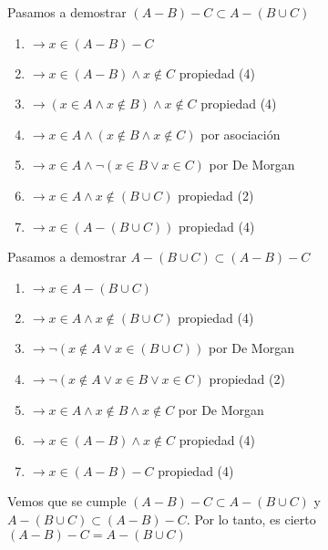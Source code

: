         Pasamos a demostrar $ (A - B) - C \subset A - (B \cup C) $
        
        \begin{enumerate}
            \item $\to x \in (A - B) - C  $ 
            \item $\to x \in (A - B) \wedge x \notin C $ propiedad (4)
            \item $\to (x \in A  \wedge x \notin B) \wedge x \notin C $ propiedad (4)
            \item $\to x \in A  \wedge (x \notin B \wedge x \notin C) $ por  asociación
            \item $\to x \in A  \wedge \neg (x \in B \vee x \in C) $ por  De Morgan
            \item $\to x \in A  \wedge x \notin (B \cup C) $ propiedad (2)
            \item $\to x \in (A - (B \cup C)) $ propiedad (4)
        \end{enumerate}
        
        Pasamos a demostrar $  A - (B \cup C) \subset (A - B) - C $
        \begin{enumerate}
            \item $\to x \in A  - (B \cup C) $ 
            \item $\to x \in A  \wedge x \notin (B \cup C) $ propiedad (4)
            \item $\to \neg (x \notin A  \vee x \in (B \cup C)) $ por De Morgan
            \item $\to \neg (x \notin A  \vee x \in B \vee x \in C) $ propiedad (2)
            \item $\to x \in A  \wedge x \notin B \wedge x \notin C $ por De Morgan
            \item $\to x \in (A-B) \wedge x \notin C  $ propiedad (4)
            \item $\to x \in (A-B)-C $ propiedad (4)
        \end{enumerate}
        
        Vemos que se cumple $ (A - B) - C \subset A - (B \cup C) $ y $  A - (B \cup C) \subset (A - B) - C $. Por lo tanto,  es cierto  $(A - B) - C = A - (B \cup C)$